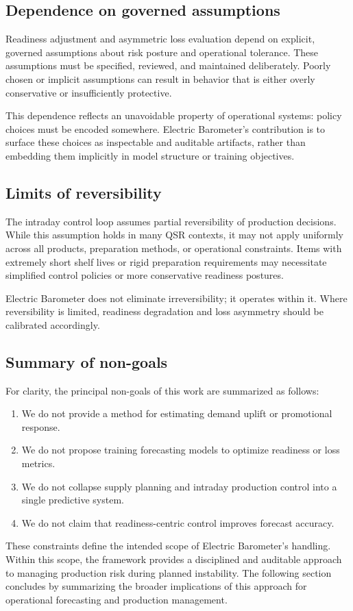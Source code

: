 \subsection{Dependence on governed assumptions}
\label{subsec:assumption-dependence}

Readiness adjustment and asymmetric loss evaluation depend on explicit, governed assumptions
about risk posture and operational tolerance. These assumptions must be specified, reviewed, and
maintained deliberately. Poorly chosen or implicit assumptions can result in behavior that is either
overly conservative or insufficiently protective.

This dependence reflects an unavoidable property of operational systems: policy choices must be
encoded somewhere. Electric Barometer’s contribution is to surface these choices as inspectable and
auditable artifacts, rather than embedding them implicitly in model structure or training objectives.

\subsection{Limits of reversibility}
\label{subsec:reversibility-limits}

The intraday control loop assumes partial reversibility of production decisions. While this assumption
holds in many QSR contexts, it may not apply uniformly across all products, preparation methods, or
operational constraints. Items with extremely short shelf lives or rigid preparation requirements may
necessitate simplified control policies or more conservative readiness postures.

Electric Barometer does not eliminate irreversibility; it operates within it. Where reversibility is
limited, readiness degradation and loss asymmetry should be calibrated accordingly.

\subsection{Summary of non-goals}
\label{subsec:non-goals-summary}

For clarity, the principal non-goals of this work are summarized as follows:
\begin{enumerate}[leftmargin=*, itemsep=2pt]
  \item We do not provide a method for estimating \LTO{} demand uplift or promotional response.
  \item We do not propose training forecasting models to optimize readiness or loss metrics.
  \item We do not collapse supply planning and intraday production control into a single predictive
  system.
  \item We do not claim that readiness-centric control improves forecast accuracy.
\end{enumerate}

These constraints define the intended scope of Electric Barometer’s \LTO{} handling. Within this
scope, the framework provides a disciplined and auditable approach to managing production risk
during planned instability. The following section concludes by summarizing the broader implications
of this approach for operational forecasting and production management.
